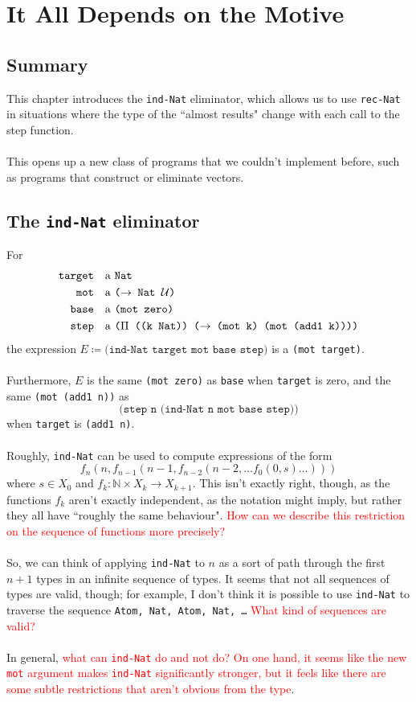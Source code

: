 \documentclass{article}
\newcommand{\ttt}[1]{\texttt{#1}}
\newcommand{\bb}[1]{\mathbb{#1}}
\newcommand{\bN}{\bb{N}}
\begin{document}
\section{It All Depends on the Motive}
\subsection{Summary}
This chapter introduces the \ttt{ind-Nat} eliminator, which allows us to use \ttt{rec-Nat} in situations where the type of the ``almost results" change with each call to the step function. 
\\ \\
This opens up a new class of programs that we couldn't implement before, such as programs that construct or eliminate vectors.
\subsection{The \ttt{ind-Nat} eliminator}
For
\begin{align*}
    \ttt{target} &\quad \text{a \ttt{Nat}} \\
    \ttt{mot} &\quad \text{a \ttt{(\(\to\) Nat \(\mathcal{U}\))}} \\
    \ttt{base} &\quad \text{a \ttt{(mot zero)}} \\
    \ttt{step} &\quad \text{a \ttt{(\(\Pi\) ((k Nat)) (\(\to\) (mot k) (mot (add1 k))))}}
\end{align*}
the expression \(E \coloneqq \ttt{(ind-Nat target mot base step)}\) is a \ttt{(mot target)}.
\\ \\
Furthermore, \(E\) is the same \ttt{(mot zero)} as \ttt{base} when \ttt{target} is zero, and the same \ttt{(mot (add1 n))} as \[
    \ttt{(step n (ind-Nat n mot base step))}
\] when \ttt{target} is \ttt{(add1 n)}.
\\ \\
Roughly, \ttt{ind-Nat} can be used to compute expressions of the form \[
    f_n(n, f_{n - 1}(n-1, f_{n-2}(n - 2, \dots f_0(0, s)\dots)))
\] where \(s \in X_0\) and \(f_k : \bN \times X_k \to X_{k + 1}\). This isn't exactly right, though, as the functions \(f_k\) aren't exactly independent, as the notation might imply, but rather they all have ``roughly the same behaviour". \textcolor{red}{How can we describe this restriction on the sequence of functions more precisely?}
\\ \\
So, we can think of applying \ttt{ind-Nat} to \(n\) as a sort of path through the first \(n + 1\) types in an infinite sequence of types. It seems that not all sequences of types are valid, though; for example, I don't think it is possible to use \ttt{ind-Nat} to traverse the sequence \ttt{Atom, Nat, Atom, Nat, \dots} \textcolor{red}{What kind of sequences are valid?}
\\ \\
In general, \textcolor{red}{what can \ttt{ind-Nat} do and not do? On one hand, it seems like the new \ttt{mot} argument makes \ttt{ind-Nat} significantly stronger, but it feels like there are some subtle restrictions that aren't obvious from the type}.
\end{document}
